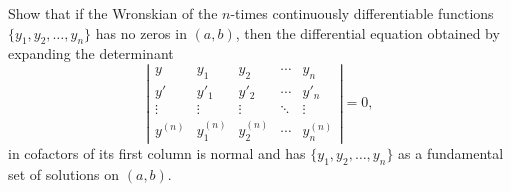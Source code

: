 \documentclass{ximera}
\begin{document}
\begin{problem}\label{exer:9.1.23}
Show that if the Wronskian of the $n$-times continuously
differentiable functions $\{y_1,y_2,\dots,y_n\}$ has no zeros in
$(a,b)$, then the differential equation obtained by expanding the
determinant
$$
\left|\begin{array}{ccccc}
y&y_1&y_2&\cdots&y_n\\ 
y'&y'_1&y'_2&\cdots&y'_n\\ 
\vdots&\vdots&\vdots&\ddots&
 \vdots\\ 
y^{(n)}&y_{1}^{(n)}&y_2^{(n)}&\cdots&y_n^{(n)}
\end{array}\right|=0,
$$
in cofactors of its first column is normal and has
$\{y_1,y_2,\dots,y_n\}$ as a fundamental set of solutions on $(a,b)$.
\end{problem}
\end{document}
